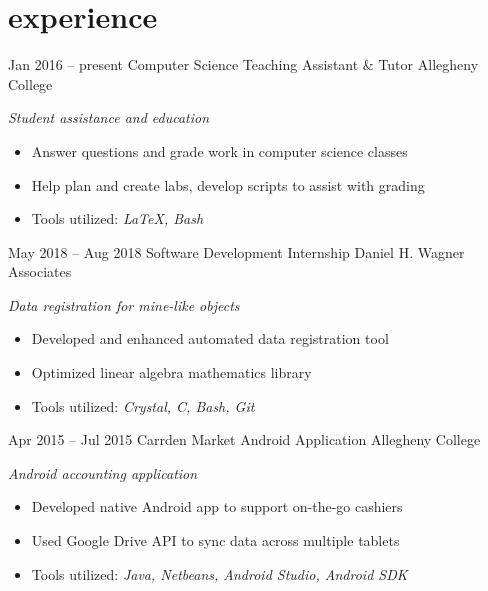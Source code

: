 \documentclass[]{friggeri-cv}
\begin{document}
\section{experience}
\begin{entrylist}
  \entry
    {Jan 2016 -- present}
    {Computer Science Teaching Assistant \& Tutor}
    {Allegheny College}
    {\emph{Student assistance and education}
    \begin{itemize}[leftmargin=1.2em]
    \item Answer questions and grade work in computer science classes
    \item Help plan and create labs, develop scripts to assist with grading
    \item Tools utilized: \emph{\LaTeX , Bash}
    \end{itemize}}
  \entry
    {May 2018 -- Aug 2018}
    {Software Development Internship}
    {Daniel H. Wagner Associates}
    {\emph{Data registration for mine-like objects}
    \begin{itemize}[leftmargin=1.2em]
    \item Developed and enhanced automated data registration tool
    \item Optimized linear algebra mathematics library
    \item Tools utilized: \emph{Crystal, C, Bash, Git}
    \end{itemize}}
  \entry
    {Apr 2015 -- Jul 2015}
    {Carrden Market Android Application}
    {Allegheny College}
    {\emph{Android accounting application}
    \begin{itemize}[leftmargin=1.2em]
    \item Developed native Android app to support on-the-go cashiers
    \item Used Google Drive API to sync data across multiple tablets
    \item Tools utilized: \emph{Java, Netbeans, Android Studio, Android SDK}
    \end{itemize}}
\end{entrylist}
\end{document}
